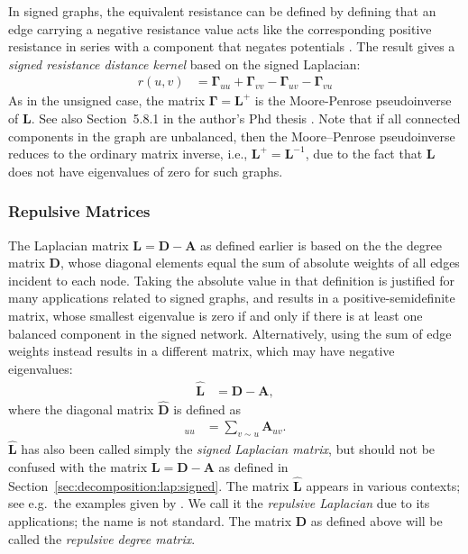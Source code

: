 \documentclass{article}
\begin{document}
In signed graphs, the equivalent resistance can be defined by
defining that an edge carrying a negative resistance value acts like the
corresponding positive resistance in series with a component that
negates potentials \citep{kunegis:netflix-srd}.  The result 
gives a \emph{signed resistance distance kernel} based on the signed
Laplacian:
\begin{align}
  r(u,v) &= \mathbf \Gamma_{uu} + \mathbf \Gamma_{vv} 
  - \mathbf \Gamma_{uv} - \mathbf \Gamma_{vu} 
\end{align}
As in the unsigned case, the matrix $\mathbf \Gamma=\mathbf L^+$ is the
Moore-Penrose pseudoinverse of $\mathbf L$.  See also Section~5.8.1 in
the author's Phd thesis \citep{kunegis:phd}.  Note that if all connected
components in the graph are unbalanced, then the Moore--Penrose
pseudoinverse reduces to the ordinary matrix inverse, i.e., $\mathbf
L^+=\mathbf L^{-1}$, due to the fact that $\mathbf L$ does not have
eigenvalues of zero for such graphs. 

\subsubsection{Repulsive Matrices}
\label{sec:matrix.repulsive}
The Laplacian matrix $\mathbf L = \mathbf D - \mathbf A$ as defined
earlier is based on the the degree matrix $\mathbf D$, whose diagonal
elements equal the sum of absolute weights of all edges incident to each
node.  
Taking the absolute value in that definition is justified for
many applications related to signed graphs, and results in a positive-semidefinite matrix, whose
smallest eigenvalue is zero if and only if there is at least one
balanced component in the signed network.  Alternatively, using the sum
of edge weights instead results in a different matrix, which may have
negative eigenvalues:
\begin{align}
  \mathbf{\hat L} &= \mathbf{\hat D} - \mathbf A,
\end{align}
where the diagonal matrix $\mathbf{\hat D}$ is defined as
\begin{align*}
  [\mathbf{\hat D}]_{uu} &= \sum_{v \sim u} \mathbf A_{uv}.
\end{align*}
$\mathbf{\hat L}$ has also been called simply the \emph{signed Laplacian
  matrix}, but should not be confused with the matrix $\mathbf L =
\mathbf D - \mathbf A$ as defined in
Section~\ref{sec:decomposition:lap:signed}. 
The matrix $\mathbf{\hat L}$ appears in various contexts; see e.g.\ the
examples given by \cite{b875}.  We call it the \emph{repulsive
  Laplacian} due to its applications; the name is not standard.  The
matrix $\mathbf{\hat D}$ as defined above will be called the
\emph{repulsive degree matrix}. 
\end{document}
